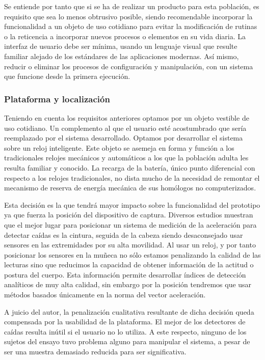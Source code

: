 Se entiende por tanto que si se ha de realizar un producto para esta población, es requisito que sea lo menos obtrusivo posible, siendo recomendable incorporar la funcionalidad a un objeto de uso cotidiano para evitar la modificación de rutinas o la reticencia a incorporar nuevos procesos o elementos en su vida diaria. La interfaz de usuario debe ser mínima, usando un lenguaje visual que resulte familiar alejado de los estándares de las aplicaciones modernas. Así mismo, reducir o eliminar los procesos de configuración y manipulación, con un sistema que funcione desde la primera ejecución.

\subsubsection{Plataforma y localización}
Teniendo en cuenta los requisitos anteriores optamos por un objeto vestible de uso cotidiano. Un complemento al que el usuario esté acostumbrado que sería reemplazado por el sistema desarrollado. Optamos por desarrollar el sistema sobre un reloj inteligente. Este objeto se asemeja en forma y función a los tradicionales relojes mecánicos y automáticos a los que la población adulta les resulta familiar y conocido. La recarga de la batería, único punto diferencial con respecto a los relojes tradicionales, no dista mucho de la necesidad de remontar el mecanismo de reserva de energía mecánica de sus homólogos no computerizados.

Esta decisión es la que tendrá mayor impacto sobre la funcionalidad del prototipo ya que fuerza la posición del dispositivo de captura. Diversos estudios muestran que el mejor lugar para posicionar un sistema de medición de la aceleración para detectar caídas es la cintura, seguida de la cabeza siendo desaconsejado usar sensores en las extremidades por su alta movilidad\cite{Chen2005, Kangas2008, Noury2007}. Al usar un reloj, y por tanto posicionar los sensores en la muñeca no sólo estamos penalizando la calidad de las lecturas sino que reducimos la capacidad de obtener información de la actitud o postura del cuerpo. Esta información permite desarrollar índices de detección analíticos de muy alta calidad, sin embargo por la posición tendremos que usar métodos basados únicamente en la norma del vector aceleración.

A juicio del autor, la penalización cualitativa resultante de dicha decisión queda compensada por la usabilidad de la plataforma. El mejor de los detectores de caídas resulta inútil si el usuario no lo utiliza. A este respecto, ninguno de los sujetos del ensayo tuvo problema alguno para manipular el sistema, a pesar de ser una muestra demasiado reducida para ser significativa.

